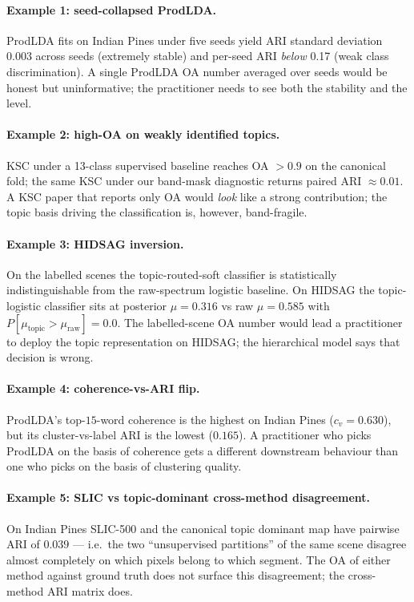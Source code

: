 \documentclass[11pt,a4paper]{article}
\begin{document}
\paragraph{Example 1: seed-collapsed ProdLDA.} ProdLDA fits on
Indian Pines under five seeds yield ARI standard deviation $0.003$
across seeds (extremely stable) and per-seed ARI \emph{below} 0.17
(weak class discrimination). A single ProdLDA OA number averaged
over seeds would be honest but uninformative; the practitioner needs
to see both the stability and the level.

\paragraph{Example 2: high-OA on weakly identified topics.}
KSC under a 13-class supervised baseline reaches OA $> 0.9$ on the
canonical fold; the same KSC under our band-mask diagnostic returns
paired ARI $\approx 0.01$. A KSC paper that reports only OA would
\emph{look} like a strong contribution; the topic basis driving the
classification is, however, band-fragile.

\paragraph{Example 3: HIDSAG inversion.} On the labelled scenes the
topic-routed-soft classifier is statistically indistinguishable from
the raw-spectrum logistic baseline. On HIDSAG the topic-logistic
classifier sits at posterior $\mu = 0.316$ vs raw $\mu = 0.585$ with
$P[\mu_{\text{topic}} > \mu_{\text{raw}}] = 0.0$. The labelled-scene
OA number would lead a practitioner to deploy the topic
representation on HIDSAG; the hierarchical model says that decision
is wrong.

\paragraph{Example 4: coherence-vs-ARI flip.} ProdLDA's
top-$15$-word coherence is the highest on Indian Pines
($c_v = 0.630$), but its cluster-vs-label ARI is the lowest
($0.165$). A practitioner who picks ProdLDA on the basis of
coherence gets a different downstream behaviour than one who picks
on the basis of clustering quality.

\paragraph{Example 5: SLIC vs topic-dominant cross-method
disagreement.} On Indian Pines SLIC-500 and the canonical topic
dominant map have pairwise ARI of $0.039$ --- i.e.\ the two
``unsupervised partitions'' of the same scene disagree almost
completely on which pixels belong to which segment. The OA of
either method against ground truth does not surface this
disagreement; the cross-method ARI matrix does.
\end{document}
